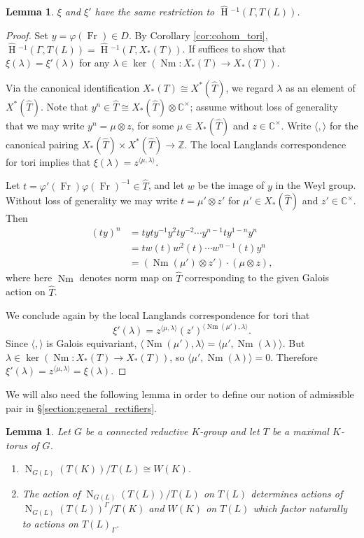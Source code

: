 \documentclass{compositio}
\theoremstyle{plain}
\newtheorem{lemma}[theorem]{Lemma}
\newcommand{\HT}[1]{\hat{\HH}{}^{#1}}
\theoremstyle{definition}
\numberwithin{equation}{section}
\DeclareMathOperator{\HH}{H}
\DeclareMathOperator{\Nm}{Nm}
\DeclareMathOperator{\Fr}{Fr}
\newcommand{\CC}{\mathbb{C}}
\newcommand{\ZZ}{\mathbb{Z}}
\newcommand{\Normalizer}[2]{\operatorname{N}_{#2}(#1)}
\begin{document}
\begin{lemma} \label{lem:toral_modification}
$\xi$ and $\xi'$ have the same restriction to $\HT{-1}(\Gamma, T(L))$.
\end{lemma}

\begin{proof}
Set $y = \varphi(\Fr) \in D$.  By Corollary \ref{cor:cohom_tori},
$\HT{-1}(\Gamma, T(L)) = \HT{-1}(\Gamma, X_*(T))$.
If suffices to show that $\xi(\lambda) = \xi'(\lambda)$ for any $\lambda \in \ker(\Nm : X_*(T) \rightarrow X_*(T))$.

Via the canonical identification $X_*(T) \cong X^*(\hat{T})$,
we regard $\lambda$ as an element of $X^*(\hat{T})$.  Note that $y^n \in \hat{T} \cong X_*(\hat{T}) \otimes \CC^\times$;
assume without loss of generality that we may write $y^n = \mu \otimes z$, for some $\mu \in X_*(\hat{T})$ and
$z \in \CC^{\times}$.  Write $\langle , \rangle$ for the canonical pairing $X_*(\hat{T}) \times X^*(\hat{T}) \to \ZZ$.  The local Langlands
correspondence for tori implies that $\xi(\lambda) = z^{\langle \mu, \lambda \rangle}$.

Let $t = \varphi'(\Fr)\varphi(\Fr)^{-1} \in \hat{T}$, and let $w$ be the image of $y$ in the Weyl group. Without
loss of generality we may write $t = \mu' \otimes z'$ for $\mu' \in X_*(\hat{T})$
and $z' \in \mathbb{C}^{\times}$.  Then
\begin{align*}
(ty)^n &= t yty^{-1} y^2 t y^{-2} \cdots y^{n-1} t y^{1-n} y^n \\
&= t w(t) w^2(t) \cdots w^{n-1}(t) y^n \\
&=(\Nm(\mu' ) \otimes z') \cdot (\mu \otimes z),
\end{align*}
where here $\Nm$ denotes norm map on $\hat{T}$ corresponding to the given Galois action on $\hat{T}$.

We conclude again by the local Langlands correspondence for tori that
\[
\xi'(\lambda) = z^{\langle \mu, \lambda \rangle} (z' )^{\langle \Nm(\mu'), \lambda \rangle}.
\]
Since $\langle , \rangle$ is Galois equivariant, $\langle \Nm(\mu'), \lambda \rangle = \langle\mu', \Nm(\lambda)\rangle$.
But $\lambda \in \ker(\Nm : X_*(T) \rightarrow X_*(T))$, so $\langle\mu', \Nm(\lambda)\rangle = 0$.
Therefore $\xi'(\lambda) = z^{\langle\mu, \lambda\rangle} = \xi(\lambda)$.
\end{proof}

We will also need the following lemma in order to define our notion of admissible pair
in \S\ref{section:general_rectifiers}.

\begin{lemma} \label{lem:weyl_groups}
Let $G$ be a connected reductive $K$-group and let $T$ be a maximal
$K$-torus of $G$.
\begin{enumerate}
\item $\Normalizer{T(K)}{G(L)} / T(L) \cong W(K)$.
\item The action of $\Normalizer{T(L)}{G(L)} / T(L)$ on $T(L)$ determines
actions of $\Normalizer{T(L)}{G(L)}^\Gamma / T(K)$ and $W(K)$
on $T(L)$ which factor naturally to actions on $T(L)_\Gamma$.
\end{enumerate}
\end{lemma}
\end{document}
